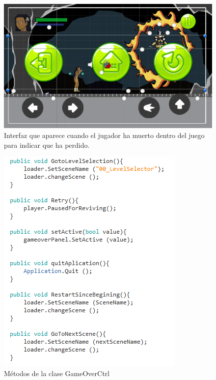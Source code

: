 	\begin{figure}[h]
		\centering
		\includegraphics[height=0.2 \textheight]{03TrabajoRealizado/imagenes/GameOverPanel.png}
		\caption{Interfaz que aparece cuando el jugador ha muerto dentro del juego para indicar que ha perdido.}
		\label{fig:GameOverInterfaz}
	\end{figure} 
	
	\begin{figure}[h]
		\centering
		\includegraphics[height=0.2 \textheight]{03TrabajoRealizado/imagenes/GameOverCtrl.png}
		\caption{Métodos de la clase GameOverCtrl}
		\label{fig:GameOverCtrl}
	\end{figure} 

